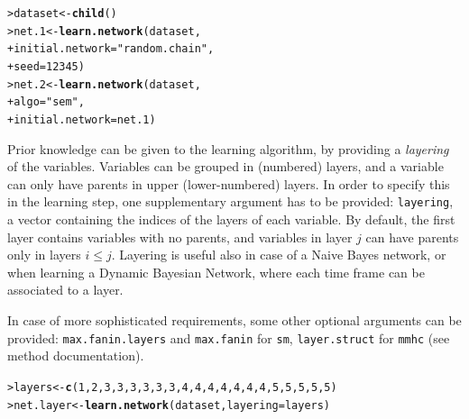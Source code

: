\documentclass{article}\usepackage[]{graphicx}\usepackage[]{color}
\makeatletter
\newcommand{\hlnum}[1]{\textcolor[rgb]{0.686,0.059,0.569}{#1}}%
\newcommand{\hlstr}[1]{\textcolor[rgb]{0.192,0.494,0.8}{#1}}%
\newcommand{\hlstd}[1]{\textcolor[rgb]{0.345,0.345,0.345}{#1}}%
\newcommand{\hlkwb}[1]{\textcolor[rgb]{0.69,0.353,0.396}{#1}}%
\newcommand{\hlkwc}[1]{\textcolor[rgb]{0.333,0.667,0.333}{#1}}%
\newcommand{\hlkwd}[1]{\textcolor[rgb]{0.737,0.353,0.396}{\textbf{#1}}}%
\newenvironment{kframe}{%
 \def\at@end@of@kframe{}%
 \ifinner\ifhmode%
  \def\at@end@of@kframe{\end{minipage}}%
  \begin{minipage}{\columnwidth}%
 \fi\fi%
 \def\FrameCommand##1{\hskip\@totalleftmargin \hskip-\fboxsep
 \colorbox{shadecolor}{##1}\hskip-\fboxsep
     \hskip-\linewidth \hskip-\@totalleftmargin \hskip\columnwidth}%
 \MakeFramed {\advance\hsize-\width
   \@totalleftmargin\z@ \linewidth\hsize
   \@setminipage}}%
 {\par\unskip\endMakeFramed%
 \at@end@of@kframe}
\newenvironment{knitrout}{}{} %
\newcommand{\Rfunarg}[1]{{\texttt{#1}}}
\makeatother
\begin{document}
\begin{knitrout}
\color{fgcolor}\begin{kframe}
\begin{alltt}
\hlstd{> }\hlstd{dataset} \hlkwb{<-} \hlkwd{child}\hlstd{()}
\hlstd{> }\hlstd{net.1}   \hlkwb{<-} \hlkwd{learn.network}\hlstd{(dataset,}
\hlstd{+ }                         \hlkwc{initial.network} \hlstd{=} \hlstr{"random.chain"}\hlstd{,}
\hlstd{+ }                         \hlkwc{seed} \hlstd{=} \hlnum{12345}\hlstd{)}
\hlstd{> }\hlstd{net.2}   \hlkwb{<-} \hlkwd{learn.network}\hlstd{(dataset,}
\hlstd{+ }                         \hlkwc{algo} \hlstd{=} \hlstr{"sem"}\hlstd{,}
\hlstd{+ }                         \hlkwc{initial.network} \hlstd{= net.1)}
\end{alltt}
\end{kframe}
\end{knitrout}

Prior knowledge can be given to the learning algorithm, by providing a \textit{layering} of the variables.
Variables can be grouped in (numbered) layers, and a variable can only have parents in upper (lower-numbered) layers. In order to specify this in the learning step, one supplementary argument has to be provided: \texttt{layering}, a vector containing the indices of the layers of each variable. By default, the first layer contains variables with no parents, and variables in layer $j$ can have parents only in layers $i \leq j$.
Layering is useful also in case of a Naive Bayes network, or when learning a Dynamic Bayesian Network,
where each time frame can be associated to a layer.

In case of more sophisticated requirements, some other optional arguments can be provided: \Rfunarg{max.fanin.layers} and \Rfunarg{max.fanin} for \Rfunarg{sm}, \Rfunarg{layer.struct} for \Rfunarg{mmhc} (see method documentation).
\begin{knitrout}
\color{fgcolor}\begin{kframe}
\begin{alltt}
\hlstd{> }\hlstd{layers} \hlkwb{<-} \hlkwd{c}\hlstd{(}\hlnum{1}\hlstd{,}\hlnum{2}\hlstd{,}\hlnum{3}\hlstd{,}\hlnum{3}\hlstd{,}\hlnum{3}\hlstd{,}\hlnum{3}\hlstd{,}\hlnum{3}\hlstd{,}\hlnum{3}\hlstd{,}\hlnum{4}\hlstd{,}\hlnum{4}\hlstd{,}\hlnum{4}\hlstd{,}\hlnum{4}\hlstd{,}\hlnum{4}\hlstd{,}\hlnum{4}\hlstd{,}\hlnum{4}\hlstd{,}\hlnum{5}\hlstd{,}\hlnum{5}\hlstd{,}\hlnum{5}\hlstd{,}\hlnum{5}\hlstd{,}\hlnum{5}\hlstd{)}
\hlstd{> }\hlstd{net.layer} \hlkwb{<-} \hlkwd{learn.network}\hlstd{(dataset,} \hlkwc{layering} \hlstd{= layers)}
\end{alltt}
\end{kframe}
\end{knitrout}
\end{document}
